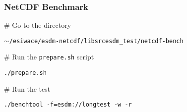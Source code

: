 \subsubsection{NetCDF Benchmark}
\label{doc:netcdf-bench}

\begin{framed}

\# Go to the directory

\texttt{$\sim$/esiwace/esdm-netcdf/libsrcesdm\_test/netcdf-bench}

\# Run the \texttt{prepare.sh} script

\texttt{./prepare.sh}

\# Run the test

\texttt{./benchtool -f=esdm://longtest -w -r}

\end{framed}

